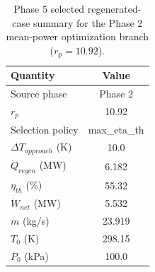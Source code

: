 \begin{table}[htbp]
    \centering
    \caption{Phase 5 selected regenerated-case summary for the Phase 2 mean-power optimization branch ($r_p = 10.92$).}
    \label{tab:phase5_selected_case_summary_phase2_optimization}
    \begin{tabular}{lc}
        \hline
        Quantity & Value \\
        \hline
        Source phase & Phase 2 \\
        $r_p$ & 10.92 \\
        Selection policy & max_eta_th \\
        $\Delta T_{approach}$ (K) & 10.0 \\
        $\dot{Q}_{regen}$ (MW) & 6.182 \\
        $\eta_{th}$ (\%) & 55.32 \\
        $\dot{W}_{net}$ (MW) & 5.532 \\
        $\dot{m}$ (kg/s) & 23.919 \\
        $T_0$ (K) & 298.15 \\
        $P_0$ (kPa) & 100.0 \\
        \hline
    \end{tabular}
\end{table}